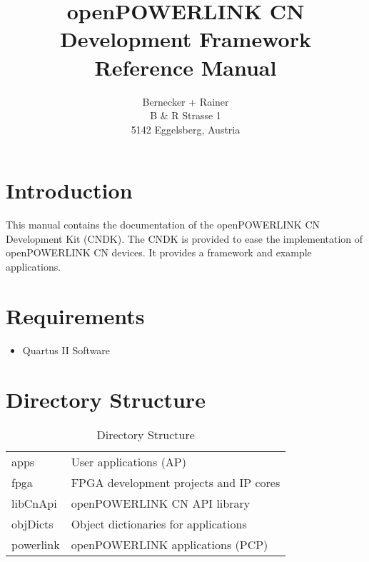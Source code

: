 \documentclass[a4paper,10pt]{article}
\title{openPOWERLINK CN Development Framework\\Reference Manual}
\date{}
\author{Bernecker + Rainer\\ B \& R Strasse 1\\ 5142 Eggelsberg, Austria\\}
\begin{document}
\maketitle
\newpage

\tableofcontents %
\cleardoublepage %

\pagestyle{headings} %

\section{Introduction}
\label{sec:Introduction}
This manual contains the documentation of the openPOWERLINK CN Development Kit (CNDK). The CNDK is provided to ease the implementation of openPOWERLINK CN devices. It provides a framework and example applications. 

\section{Requirements}
\label{sec:Requirements}
\begin{itemize}
	\item Quartus II Software
\end{itemize}

\section{Directory Structure}
\label{sec:DirectoryStructure}
\begin{table}[ht]
		\begin{tabular}{ll}
			apps 			& User applications (AP)\\
			fpga			& FPGA development projects and IP cores \\
			libCnApi		& openPOWERLINK CN API library \\
			objDicts		& Object dictionaries for applications \\
			powerlink		& openPOWERLINK applications (PCP) \\			
		\end{tabular}
	\caption{Directory Structure}
	\label{tab:DirectoryStructure}
\end{table}





\clearpage
{}
\listoffigures
\clearpage
{}
\listoftables
\end{document}
